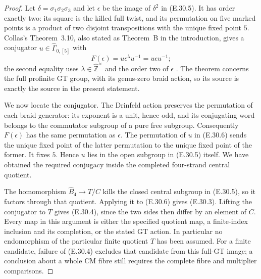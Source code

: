 \begin{proof}
Let $\delta=\sigma_1\sigma_2\sigma_3$ and let $\epsilon$ be
the image of $\delta^2$ in \textup{(E.30.5)}.  It has order
exactly two: its square is the killed full twist, and its
permutation on five marked points is a product of two disjoint
transpositions with the unique fixed point $5$.
Collas's Theorem~3.10, also stated as Theorem~B in the
introduction, gives a conjugator
$u\in\widehat\Gamma_{0,[5]}$ with
\[
                         F(\epsilon)=u\epsilon^\lambda u^{-1}
                                      =u\epsilon u^{-1};
 \tag{E.30.6}
\]
the second equality uses $\lambda\in\widehat{\mathbb Z}^{\times}$
and the order two of $\epsilon$
\cite{ERootCollas2012}.
The theorem concerns the full profinite GT group, with its
genus-zero braid action, so its source is exactly the source
in the present statement.

We now locate the conjugator.  The Drinfeld action preserves
the permutation of each braid generator: its exponent is a
unit, hence odd, and its conjugating word belongs to the
commutator subgroup of a pure free subgroup.  Consequently
$F(\epsilon)$ has the same permutation as $\epsilon$.
The permutation of $u$ in \textup{(E.30.6)} sends the unique
fixed point of the latter permutation to the unique fixed
point of the former.  It fixes $5$.  Hence $u$ lies in the
open subgroup in \textup{(E.30.5)} itself.  We have obtained
the required conjugacy inside the completed four-strand
central quotient.

The homomorphism $\widehat B_4\to T/C$ kills the closed
central subgroup in \textup{(E.30.5)}, so it factors through
that quotient.  Applying it to \textup{(E.30.6)} gives
\textup{(E.30.3)}.  Lifting the conjugator to $T$ gives
\textup{(E.30.4)}, since the two sides then differ by an
element of $C$.  Every map in this argument is either the
specified quotient map, a finite-index inclusion and its
completion, or the stated GT action.  In particular no
endomorphism of the particular finite quotient $T$ has been
assumed.  For a finite candidate, failure of
\textup{(E.30.4)} excludes that candidate from this full-GT
image; a conclusion about a whole CM fibre still requires
the complete fibre and multiplier comparisons.
\end{proof}
